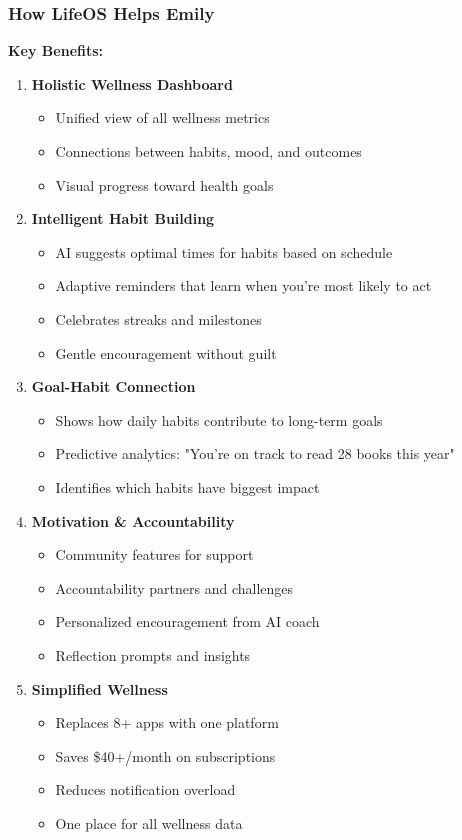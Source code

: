 \subsubsection{How LifeOS Helps Emily}

\textbf{Key Benefits:}

\begin{enumerate}
    \item \textbf{Holistic Wellness Dashboard}
    \begin{itemize}
        \item Unified view of all wellness metrics
        \item Connections between habits, mood, and outcomes
        \item Visual progress toward health goals
    \end{itemize}
    
    \item \textbf{Intelligent Habit Building}
    \begin{itemize}
        \item AI suggests optimal times for habits based on schedule
        \item Adaptive reminders that learn when you're most likely to act
        \item Celebrates streaks and milestones
        \item Gentle encouragement without guilt
    \end{itemize}
    
    \item \textbf{Goal-Habit Connection}
    \begin{itemize}
        \item Shows how daily habits contribute to long-term goals
        \item Predictive analytics: "You're on track to read 28 books this year"
        \item Identifies which habits have biggest impact
    \end{itemize}
    
    \item \textbf{Motivation \& Accountability}
    \begin{itemize}
        \item Community features for support
        \item Accountability partners and challenges
        \item Personalized encouragement from AI coach
        \item Reflection prompts and insights
    \end{itemize}
    
    \item \textbf{Simplified Wellness}
    \begin{itemize}
        \item Replaces 8+ apps with one platform
        \item Saves \$40+/month on subscriptions
        \item Reduces notification overload
        \item One place for all wellness data
    \end{itemize}
\end{enumerate}

